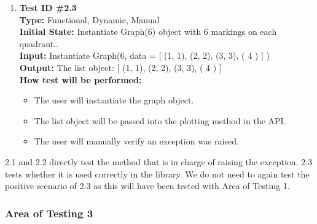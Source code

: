 \documentclass[12pt, titlepage]{article}
\begin{document}
\begin{enumerate}
			\item{\textbf{Test ID \#2.3\\}}
			\textbf{Type:} Functional, Dynamic, Manual\\
			\textbf{Initial State:} Instantiate Graph(6) object with 6 markings on each quadrant..\\
			\textbf{Input:} Instantiate Graph(6, data = [ (1, 1),  (2, 2), (3, 3), ( 4 ) ] )\\
			\textbf{Output:} The list object: [ (1, 1),  (2, 2), (3, 3), ( 4 ) ] \\
			\textbf{How test will be performed:}
				\begin{itemize}[label={--}]
					\item The user will instantiate the graph object.
					\item The list object will be passed into the plotting method in the API.
					\item The user will manually verify an exception was raised.
				\end{itemize}				

	\end{enumerate}
2.1 and 2.2 directly test the method that is in charge of raising the exception. 2.3 tests whether it is used correctly in the library. We do not need to again test the positive scenario of 2.3 as this will have been tested with Area of Testing 1. 

\subsubsection{Area of Testing 3}		
\end{document}

